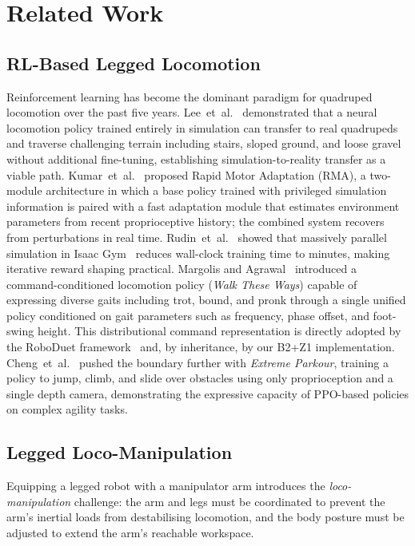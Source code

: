 
\chapter{Related Work} \label{chp:relwork}

\section{RL-Based Legged Locomotion}

Reinforcement learning has become the dominant paradigm for quadruped locomotion
over the past five years.
Lee~et~al.~\cite{lee2020learning} demonstrated that a neural locomotion policy
trained entirely in simulation can transfer to real quadrupeds and traverse
challenging terrain including stairs, sloped ground, and loose gravel without
additional fine-tuning, establishing simulation-to-reality transfer as a
viable path.
Kumar~et~al.~\cite{kumar2021rma} proposed Rapid Motor Adaptation (RMA), a
two-module architecture in which a base policy trained with privileged
simulation information is paired with a fast adaptation module that estimates
environment parameters from recent proprioceptive history; the combined system
recovers from perturbations in real time.
Rudin~et~al.~\cite{rudin2022learning} showed that massively parallel simulation
in Isaac Gym~\cite{makoviychuk2021isaac} reduces wall-clock training time to
minutes, making iterative reward shaping practical.
Margolis and Agrawal~\cite{margolis2022walk} introduced a command-conditioned
locomotion policy (\textit{Walk These Ways}) capable of expressing diverse gaits
including trot, bound, and pronk through a single unified policy conditioned on
gait parameters such as frequency, phase offset, and foot-swing height.
This distributional command representation is directly adopted by the RoboDuet
framework~\cite{pan2024roboduet} and, by inheritance, by our B2+Z1 implementation.
Cheng~et~al.~\cite{cheng2024parkour} pushed the boundary further with
\emph{Extreme Parkour}, training a policy to jump, climb, and slide over
obstacles using only proprioception and a single depth camera, demonstrating
the expressive capacity of PPO-based policies on complex agility tasks.

\section{Legged Loco-Manipulation}

Equipping a legged robot with a manipulator arm introduces the
\textit{loco-manipulation} challenge: the arm and legs must be coordinated to
prevent the arm's inertial loads from destabilising locomotion, and the body
posture must be adjusted to extend the arm's reachable workspace.

